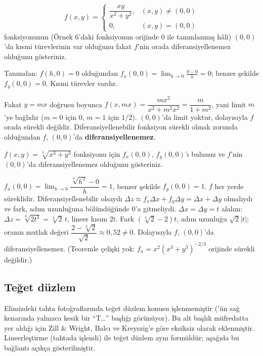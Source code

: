 \begin{soru}
\[
f(x,y)=\begin{cases}\dfrac{xy}{x^2+y^2}, & (x,y)\ne(0,0)\\[4pt] 0, & (x,y)=(0,0)\end{cases}
\]
fonksiyonunun (Örnek 6'daki fonksiyonun orijinde $0$ ile tanımlanmış hâli) $(0,0)$'da kısmi türevlerinin var olduğunu
fakat $f$'nin orada diferansiyellenemez olduğunu gösteriniz.
\end{soru}
\begin{cevap}
Tanımdan: $f(h,0)=0$ olduğundan $f_x(0,0)=\lim_{h\to0}\frac{0-0}{h}=0$; benzer şekilde $f_y(0,0)=0$. Kısmi türevler vardır.

Fakat $y=mx$ doğrusu boyunca $f(x,mx)=\dfrac{mx^2}{x^2+m^2x^2}=\dfrac{m}{1+m^2}$, yani limit $m$'ye bağlıdır
($m=0$ için $0$, $m=1$ için $1/2$). $(0,0)$'da limit yoktur, dolayısıyla $f$ orada sürekli değildir. Diferansiyellenebilir
fonksiyon sürekli olmak zorunda olduğundan $f$, $(0,0)$'da \textbf{diferansiyellenemez}.
\end{cevap}

\begin{soru}
$f(x,y)=\sqrt[3]{x^3+y^3}$ fonksiyonu için $f_x(0,0)$, $f_y(0,0)$'ı bulunuz ve $f$'nin $(0,0)$'da diferansiyellenemez
olduğunu gösteriniz.
\end{soru}
\begin{cevap}
$f_x(0,0)=\lim_{h\to0}\dfrac{\sqrt[3]{h^3}-0}{h}=1$, benzer şekilde $f_y(0,0)=1$. $f$ her yerde süreklidir.
Diferansiyellenebilir olsaydı $\Delta z\approx f_x\Delta x+f_y\Delta y=\Delta x+\Delta y$ olmalıydı ve fark,
adım uzunluğuna bölündüğünde $0$'a gitmeliydi. $\Delta x=\Delta y=t$ alalım: $\Delta z=\sqrt[3]{2t^3}=\sqrt[3]2\,t$,
lineer kısım $2t$. Fark $(\sqrt[3]2-2)t$, adım uzunluğu $\sqrt2|t|$; oranın mutlak değeri
$\dfrac{2-\sqrt[3]2}{\sqrt2}\approx0{,}52\ne0$. Dolayısıyla $f$, $(0,0)$'da diferansiyellenemez. (Teoremle çelişki yok:
$f_x=x^2(x^3+y^3)^{-2/3}$ orijinde sürekli değildir.)
\end{cevap}

\subsection{Teğet düzlem}

\begin{bilgi}
Elimizdeki tahta fotoğraflarında teğet düzlem konusu işlenmemiştir ('ün sağ kenarında yalnızca
kesik bir ``T\ldots'' başlığı görünüyor). Bu alt başlık müfredatta yer aldığı için Zill \& Wright, Balcı ve Kreyszig'e
göre eksiksiz olarak eklenmiştir. Lineerleştirme (tahtada işlendi) ile teğet düzlem aynı formüldür; aşağıda bu bağlantı
açıkça gösterilmiştir.
\end{bilgi}

